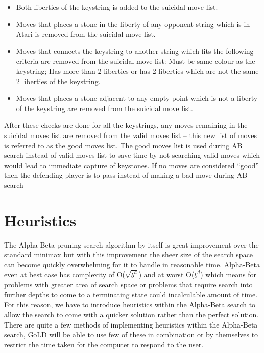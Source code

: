 \documentclass{l4proj}
\begin{document}
\begin{itemize}
	\item Both liberties of the keystring is added to the suicidal move list.
	\item Moves that places a stone in the liberty of any opponent string which is in Atari is removed from the suicidal move list.
    \item Moves that connects the keystring to another string which fits the following criteria are removed from the suicidal move list: Must be same colour as the keystring; Has more than 2 liberties or has 2 liberties which are not the same 2 liberties of the keystring.
    \item Moves that places a stone adjacent to any empty point which is not a liberty of the keystring are removed from the suicidal move list.
\end{itemize}

After these checks are done for all the keystrings, any moves remaining in the suicidal moves list are removed from the valid moves list – this new list of moves is referred to as the good moves list. The good moves list is used during AB search instead of valid moves list to save time by not searching valid moves which would lead to immediate capture of keystones. If no moves are considered “good” then the defending player is to pass instead of making a bad move during AB search


\section{Heuristics}

The Alpha-Beta pruning search algorithm by itself is great improvement over the standard minimax but with this improvement the sheer size of the search space can become quickly overwhelming for it to handle in reasonable time. Alpha-Beta even at best case has complexity of O($\sqrt{b^d}$) and at worst O($b^d$) which means for problems with greater area of search space or problems that require search into further depths to come to a terminating state could incalculable amount of time. For this reason, we have to introduce heuristics within the Alpha-Beta search to allow the search to come with a quicker solution rather than the perfect solution. There are quite a few methods of implementing heuristics within the Alpha-Beta search, GoLD will be able to use few of these in combination or by themselves to restrict the time taken for the computer to respond to the user.
\end{document}
